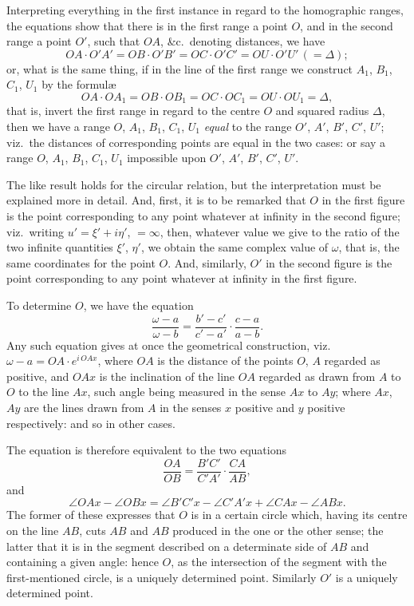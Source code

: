 \documentclass[11pt,a4paper]{book}
\begin{document}
Interpreting everything in the first instance in regard to the homographic ranges, the equations show that there is in the first range a point $O$, and in the second range a point $O'$, such that $OA$, \&c.\ denoting distances, we have
\[
OA \cdot O'A' = OB \cdot O'B' = OC \cdot O'C' = OU \cdot O'U'\, (= \Delta);
\]
or, what is the same thing, if in the line of the first range we construct $A_1$, $B_1$, $C_1$, $U_1$ by the formul\ae
\[
OA \cdot OA_1 = OB \cdot OB_1 = OC \cdot OC_1 = OU \cdot OU_1 = \Delta,
\]
that is, invert the first range in regard to the centre $O$ and squared radius $\Delta$, then we have a range $O$, $A_1$, $B_1$, $C_1$, $U_1$ \textit{equal} to the range $O'$, $A'$, $B'$, $C'$, $U'$; viz.\ the distances of corresponding points are equal in the two cases: or say a range $O$, $A_1$, $B_1$, $C_1$, $U_1$ impossible upon $O'$, $A'$, $B'$, $C'$, $U'$.

The like result holds for the circular relation, but the interpretation must be explained more in detail. And, first, it is to be remarked that $O$ in the first figure is the point corresponding to any point whatever at infinity in the second figure; viz.\ writing $u' = \xi' + i\eta'$, $= \infty$, then, whatever value we give to the ratio of the two infinite quantities $\xi'$, $\eta'$, we obtain the same complex value of $\omega$, that is, the same coordinates for the point $O$. And, similarly, $O'$ in the second figure is the point corresponding to any point whatever at infinity in the first figure.

To determine $O$, we have the equation
\[
\frac{\omega - a}{\omega - b} = \frac{b' - c'}{c' - a'} \cdot \frac{c - a}{a - b}.
\]
Any such equation gives at once the geometrical construction, viz.\ $\omega - a = OA \cdot e^{i\,OAx}$, where $OA$ is the distance of the points $O$, $A$ regarded as positive, and $OAx$ is the inclination of the line $OA$ regarded as drawn from $A$ to $O$ to the line $Ax$, such angle being measured in the sense $Ax$ to $Ay$; where $Ax$, $Ay$ are the lines drawn from $A$ in the senses $x$ positive and $y$ positive respectively: and so in other cases.

The equation is therefore equivalent to the two equations
\[
\frac{OA}{OB} = \frac{B'C'}{C'A'} \cdot \frac{CA}{AB},
\]
and
\[
\angle OAx - \angle OBx = \angle B'C'x - \angle C'A'x + \angle CAx - \angle ABx.
\]
The former of these expresses that $O$ is in a certain circle which, having its centre on the line $AB$, cuts $AB$ and $AB$ produced in the one or the other sense; the latter that it is in the segment described on a determinate side of $AB$ and containing a given angle: hence $O$, as the intersection of the segment with the first-mentioned circle, is a uniquely determined point. Similarly $O'$ is a uniquely determined point.
\end{document}
